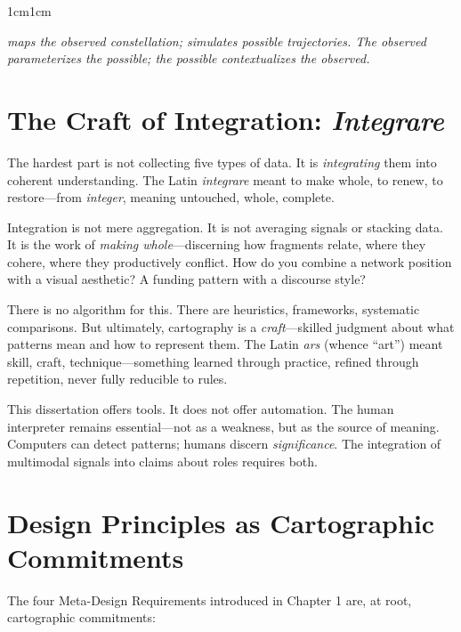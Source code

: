 \documentclass[../main.tex]{subfiles}
\begin{document}
\begin{adjustwidth}{1cm}{1cm}
\begin{center}
\small\textit{\RoleBox maps the observed constellation; \RoleSim simulates possible trajectories. The observed parameterizes the possible; the possible contextualizes the observed.}\normalsize
\end{center}

\vspace{0.8cm}

\section*{The Craft of Integration: \textit{Integrare}}

The hardest part is not collecting five types of data. It is \textit{integrating} them into coherent understanding. The Latin \textit{integrare} meant to make whole, to renew, to restore---from \textit{integer}, meaning untouched, whole, complete.

Integration is not mere aggregation. It is not averaging signals or stacking data. It is the work of \textit{making whole}---discerning how fragments relate, where they cohere, where they productively conflict. How do you combine a network position with a visual aesthetic? A funding pattern with a discourse style?

There is no algorithm for this. There are heuristics, frameworks, systematic comparisons. But ultimately, cartography is a \textit{craft}---skilled judgment about what patterns mean and how to represent them. The Latin \textit{ars} (whence ``art'') meant skill, craft, technique---something learned through practice, refined through repetition, never fully reducible to rules.

This dissertation offers tools. It does not offer automation. The human interpreter remains essential---not as a weakness, but as the source of meaning. Computers can detect patterns; humans discern \textit{significance}. The integration of multimodal signals into claims about roles requires both.

\vspace{0.8cm}

\section*{Design Principles as Cartographic Commitments}

The four Meta-Design Requirements introduced in Chapter 1 are, at root, cartographic commitments:


\end{adjustwidth}
\end{document}
